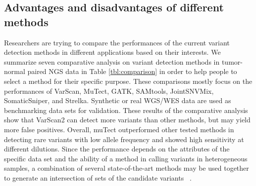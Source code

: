 \documentclass[11pt,reqno]{amsart}
\begin{document}
\subsection{Advantages and disadvantages of different methods}

Researchers are trying to compare the performances of the current variant detection methods in different applications based on their interests.
We summarize seven comparative analysis on variant detection methods in tumor-normal paired NGS data in Table \ref{tbl:comparison} in order to help people to select a method for their specific purpose.
These comparisons mostly focus on the performances of VarScan, MuTect, GATK, SAMtools, JointSNVMix, SomaticSniper, and Strelka.
Synthetic or real WGS/WES data are used as benchmarking data sets for validation.
These results of the comparative analysis show that VarScan2 can detect more variants than other methods, but may yield more false positives.
Overall, muTect outperformed other tested methods in detecting rare variants with low allele frequency and showed high sensitivity at different dilutions.
Since the performance depends on the attributes of the specific data set and the ability of a method in calling variants in heterogeneous samples, a combination of several state-of-the-art methods may be used together to generate an intersection of sets of the candidate variants ~\citep{liu2013variant}.
\end{document}
